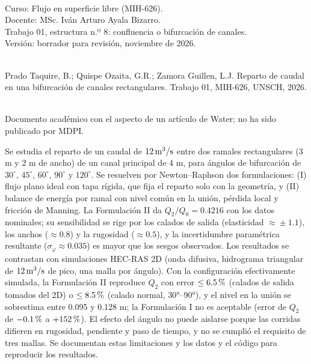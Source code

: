 \noindent\begin{wmeta}
\\
Curso: Flujo en superficie libre (MIH-626).\\
Docente: MSc. Iván Arturo Ayala Bizarro.\\
Trabajo 01, estructura n.º 8: confluencia o bifurcación de canales.\\
Versión: borrador para revisión, noviembre de 2026.

\\
Prado Taquire, B.; Quispe Ozaita, G.R.; Zamora Guillen, L.J. Reparto de caudal en una bifurcación de canales rectangulares. Trabajo 01, MIH-626, UNSCH, 2026.

\\
Documento académico con el aspecto de un artículo de Water; no ha sido publicado por MDPI.
\end{wmeta}\hfill
\begin{wabstract}
 Se estudia el reparto de un caudal de $12\,\mathrm{m^3/s}$ entre dos ramales rectangulares (3 m y 2 m de ancho) de un canal principal de 4 m, para ángulos de bifurcación de $30^\circ$, $45^\circ$, $60^\circ$, $90^\circ$ y $120^\circ$. Se resuelven por Newton--Raphson dos formulaciones: (I) flujo plano ideal con tapa rígida, que fija el reparto solo con la geometría, y (II) balance de energía por ramal con nivel común en la unión, pérdida local y fricción de Manning. La Formulación II da $Q_2/Q_0=0.4216$ con los datos nominales; su sensibilidad se rige por los calados de salida (elasticidad $\approx\!\pm1.1$), los anchos ($\approx\!0.8$) y la rugosidad ($\approx\!0.5$), y la incertidumbre paramétrica resultante ($\sigma_\varphi\approx0.035$) es mayor que los sesgos observados. Los resultados se contrastan con simulaciones HEC-RAS 2D (onda difusiva, hidrograma triangular de $12\,\mathrm{m^3/s}$ de pico, una malla por ángulo). Con la configuración efectivamente simulada, la Formulación II reproduce $Q_2$ con error $\leq6.5\text{\thinspace\%}$ (calados de salida tomados del 2D) o $\leq8.5\text{\thinspace\%}$ (calado normal, 30°--90°), y el nivel en la unión se sobrestima entre 0.095 y 0.128 m; la Formulación I no es aceptable (error de $Q_2$ de $-0.1\text{\thinspace\%}$ a $+152\text{\thinspace\%}$). El efecto del ángulo no puede aislarse porque las corridas difieren en rugosidad, pendiente y paso de tiempo, y no se cumplió el requisito de tres mallas. Se documentan estas limitaciones y los datos y el código para reproducir los resultados.
\end{wabstract}
\vspace{6pt}{\color{wgrey}\rule{\textwidth}{0.5pt}}
